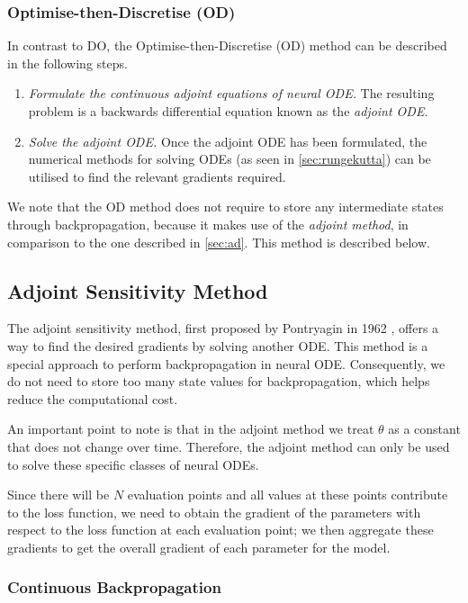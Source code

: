 \documentclass[a4paper,11pt,titlepage]{article}
\theoremstyle{definition}
\theoremstyle{plain}
\theoremstyle{remark}
\begin{document}
\subsubsection{Optimise-then-Discretise (OD)}
\label{sec:od}

In contrast to DO, the Optimise-then-Discretise (OD) method can be described in the following steps.
\begin{enumerate}
    \item \textit{Formulate the continuous adjoint equations of neural ODE.} The resulting problem is a backwards differential equation known as the \textit{adjoint ODE}.
    \item \textit{Solve the adjoint ODE.} Once the adjoint ODE has been formulated, the numerical methods for solving ODEs (as seen in \ref{sec:rungekutta}) can be utilised to find the relevant gradients required.
\end{enumerate}

We note that the OD method does not require to store any intermediate states through backpropagation, because it makes use of the \textit{adjoint method}, in comparison to the one described in \ref{sec:ad}. This method is described below.

\subsection{Adjoint Sensitivity Method}

The adjoint sensitivity method, first proposed by Pontryagin in 1962 \cite{pontryagin2018mathematical}, offers a way to find the desired gradients by solving another ODE. This method is a special approach to perform backpropagation in neural ODE. Consequently, we do not need to store too many state values for backpropagation, which helps reduce the computational cost. 

An important point to note is that in the adjoint method we treat $\theta$ as a constant that does not change over time. Therefore, the adjoint method can only be used to solve these specific classes of neural ODEs.

Since there will be $N$ evaluation points and all values at these points contribute to the loss function, we need to obtain the gradient of the parameters with respect to the loss function at each evaluation point; we then aggregate these gradients to get the overall gradient of each parameter for the model.

\subsubsection{Continuous Backpropagation}
\label{sec:contback}
\end{document}
